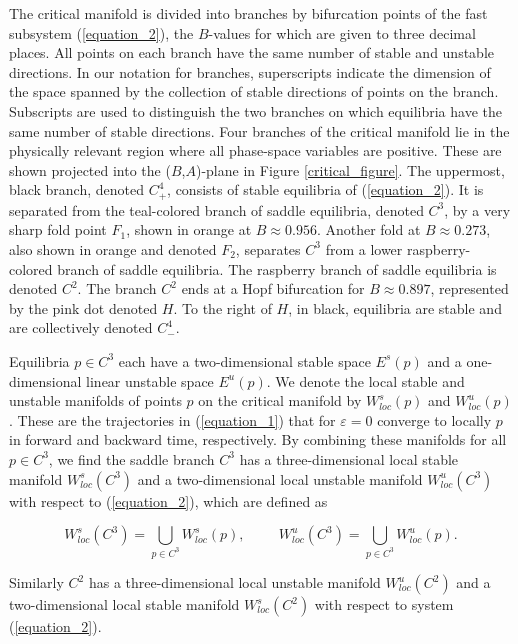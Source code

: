 \documentclass{ws-ijbc}
\begin{document}
The critical manifold is divided into branches by bifurcation points of the fast subsystem (\ref{equation_2}), the $B$-values for which are given to three decimal places.  All points on each branch have the same number of stable and unstable directions.  In our notation for branches, superscripts indicate the dimension of the space spanned by the collection of stable directions of points on the branch.  Subscripts are used to distinguish the two branches on which equilibria have the same number of stable directions.  Four branches of the critical manifold lie in the physically relevant region where all phase-space variables are positive.  These are shown projected into the ($B$,$A$)-plane in Figure \ref{critical_figure}.  The uppermost, black branch, denoted $C^4_+$, consists of stable equilibria of (\ref{equation_2}).  It is separated from the teal-colored branch of saddle equilibria, denoted $C^3$, by a very sharp fold point $F_1$, shown in orange at $B \approx 0.956$.  Another fold at $B \approx 0.273$, also shown in orange and denoted $F_2$, separates $C^3$ from a lower raspberry-colored branch of saddle equilibria.  The raspberry branch of saddle equilibria is denoted $C^2$.   The branch $C^2$ ends at a Hopf bifurcation for $B \approx 0.897$, represented by the pink dot denoted $H$.  To the right of $H$, in black, equilibria are stable and are collectively denoted $C^4_-$.

Equilibria $p \in C^3$ each have a two-dimensional stable space $E^s(p)$ and a one-dimensional linear unstable space $E^u(p)$.  We denote the local stable and unstable manifolds of points $p$ on the critical manifold by $W^{s}_{loc}(p)$ and $W^{u}_{loc}(p)$.  These are the trajectories in (\ref{equation_1}) that for $\varepsilon = 0$ converge to locally $p$ in forward and backward time, respectively.  By combining these manifolds for all $p \in C^3$, we find the saddle branch $C^3$ has a three-dimensional local stable manifold $W^{s}_{loc}(C^3)$ and a two-dimensional local unstable manifold $W^{u}_{loc}(C^3)$ with respect to (\ref{equation_2}), which are defined as
    
$$W^{s}_{loc}(C^3) = \bigcup_{p \in C^3} W^{s}_{loc}(p), \hspace{1cm} W^{u}_{loc}(C^3) = \bigcup_{p \in C^3} W^{u}_{loc}(p).$$
    
\noindent
Similarly $C^2$ has a three-dimensional local unstable manifold $W^{u}_{loc}(C^2)$ and a two-dimensional local stable manifold $W^{s}_{loc}(C^2)$ with respect to system (\ref{equation_2}).
\end{document}
